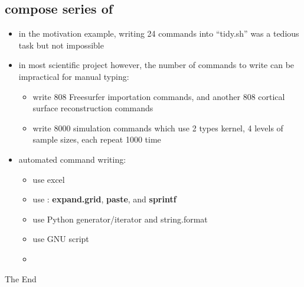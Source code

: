 \documentclass{beamer}
\begin{document}
\subsection{compose series of }
\begin{itemize}
\item in the motivation example, writing 24 commands into ``tidy.sh'' was a tedious task but
not impossible
\item in most scientific project however, the number of commands to write can be impractical
  for manual typing:
  \begin{itemize}
  \item write 808 Freesurfer importation commands, and another 808
    cortical surface reconstruction commands
  \item write 8000 simulation commands which use 2 types kernel, 4
    levels of sample sizes, each repeat 1000 time
  \end{itemize}
\item automated command writing:
  \begin{itemize}
  \item use excel
  \item use : \textbf{expand.grid}, \textbf{paste}, and
    \textbf{sprintf}
  \item use Python generator/iterator and string.format
  \item use GNU script
  \item 
  \end{itemize}
\end{itemize}

\begin{frame}
\Huge{\centerline{The End}}
\end{frame}

\end{document}
